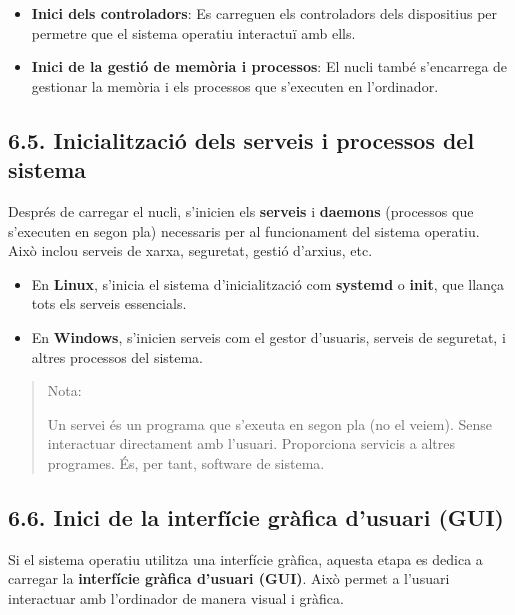 \documentclass[
  a4paper,
]{article}
\begin{document}
\begin{itemize}
\item
  \textbf{Inici dels controladors}: Es carreguen els controladors dels
  dispositius per permetre que el sistema operatiu interactuï amb ells.
\item
  \textbf{Inici de la gestió de memòria i processos}: El nucli també
  s'encarrega de gestionar la memòria i els processos que s'executen en
  l'ordinador.
\end{itemize}

\subsection{\texorpdfstring{6.5. \textbf{Inicialització dels serveis i
processos del
sistema}}{6.5. Inicialització dels serveis i processos del sistema}}\label{inicialitzaciuxf3-dels-serveis-i-processos-del-sistema}

Després de carregar el nucli, s'inicien els \textbf{serveis} i
\textbf{daemons} (processos que s'executen en segon pla) necessaris per
al funcionament del sistema operatiu. Això inclou serveis de xarxa,
seguretat, gestió d'arxius, etc.

\begin{itemize}
\item
  En \textbf{Linux}, s'inicia el sistema d'inicialització com
  \textbf{systemd} o \textbf{init}, que llança tots els serveis
  essencials.
\item
  En \textbf{Windows}, s'inicien serveis com el gestor d'usuaris,
  serveis de seguretat, i altres processos del sistema.
\end{itemize}

\begin{quote}
Nota:

Un servei és un programa que s'exeuta en segon pla (no el veiem). Sense
interactuar directament amb l'usuari. Proporciona servicis a altres
programes. És, per tant, software de sistema.
\end{quote}

\subsection{\texorpdfstring{6.6. \textbf{Inici de la interfície gràfica
d'usuari
(GUI)}}{6.6. Inici de la interfície gràfica d'usuari (GUI)}}\label{inici-de-la-interfuxedcie-gruxe0fica-dusuari-gui}

Si el sistema operatiu utilitza una interfície gràfica, aquesta etapa es
dedica a carregar la \textbf{interfície gràfica d'usuari (GUI)}. Això
permet a l'usuari interactuar amb l'ordinador de manera visual i
gràfica.
\end{document}
